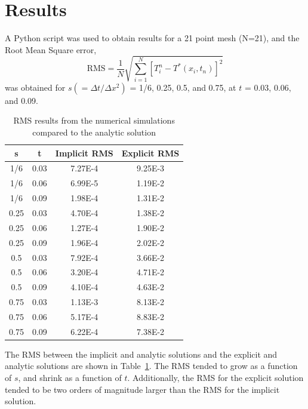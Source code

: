 \documentclass[twocolumn,10pt]{asme2ej}
\begin{document}
\section{Results}

A Python script was used to obtain results for a 21 point mesh (N=21), and the Root Mean Square error,
\begin{equation}
\mbox{RMS} = \frac{1}{N}\sqrt{\sum\limits_{i=1}^N[T_i^n - T^*(x_i, t_n)]^2}
\end{equation}
was obtained for $s(=\Delta t/ \Delta x^2)$ = 1/6, 0.25, 0.5, and 0.75, at $t$ = 0.03, 0.06, and 0.09.

\begin{table}[t]
\begin{center}
\label{table_ASME}
\begin{tabular}{|c c | c c|}
\hline
s & t & Implicit RMS & Explicit RMS \\
\hline
1/6 & 0.03 & 7.27E-4 & 9.25E-3\\
1/6 & 0.06 & 6.99E-5 & 1.19E-2\\
1/6 & 0.09 & 1.98E-4 & 1.31E-2\\
\hline
0.25 & 0.03 & 4.70E-4 & 1.38E-2\\
0.25 & 0.06 & 1.27E-4 & 1.90E-2\\
0.25 & 0.09 & 1.96E-4 & 2.02E-2\\
\hline
0.5 & 0.03 & 7.92E-4 & 3.66E-2\\
0.5 & 0.06 & 3.20E-4 & 4.71E-2\\
0.5 & 0.09 & 4.10E-4 & 4.63E-2\\
\hline
0.75 & 0.03 & 1.13E-3 & 8.13E-2 \\
0.75 & 0.06 & 5.17E-4 & 8.83E-2\\
0.75 & 0.09 & 6.22E-4 & 7.38E-2 \\
\hline
\end{tabular}
\caption{RMS results from the numerical simulations compared to the analytic solution}
\end{center}
\end{table}


The RMS between the implicit and analytic solutions and the explicit and analytic solutions are shown in Table~\ref{table_ASME}. The RMS tended to grow as a function of $s$, and shrink as a function of $t$. Additionally, the RMS for the explicit solution tended to be two orders of magnitude larger than the RMS for the implicit solution.
\end{document}
